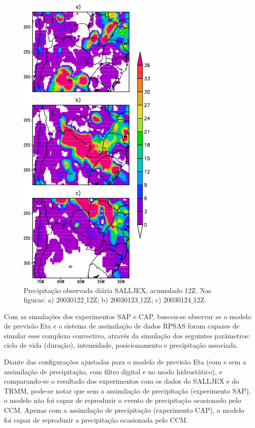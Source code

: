 \begin{figure}
\centering
\includegraphics[height=15cm]{./figs/prec_salljex1.png}
\caption{Precipitação observada diária SALLJEX, acumulado 12Z. Nas figuras: a) 20030122$\_$12Z; b) 20030123$\_$12Z; c) 20030124$\_$12Z.}
\label{fig62}
\end{figure}


Com as simulações dos experimentos SAP e CAP, buscou-se observar se o modelo de previsão Eta e o sistema de assimilação de dados RPSAS foram capazes de simular esse complexo convectivo, através da simulação dos seguintes parâmetros: ciclo de vida (duração), intensidade, posicionamento e precipitação associada.

Diante das configurações ajustadas para o modelo de previsão Eta (com e sem a assimilação de precipitação, com filtro digital e no modo hidrostático), e comparando-se o resultado dos experimentos com os dados do SALLJEX e do TRMM, pode-se notar que sem a assimilação de precipitação (experimento SAP), o modelo não foi capaz de reproduzir o evento de precipitação ocasionado pelo CCM. Apenas com a assimilação de precipitação (experimento CAP), o modelo foi capaz de reproduzir a precipitação ocasionada pelo CCM.

